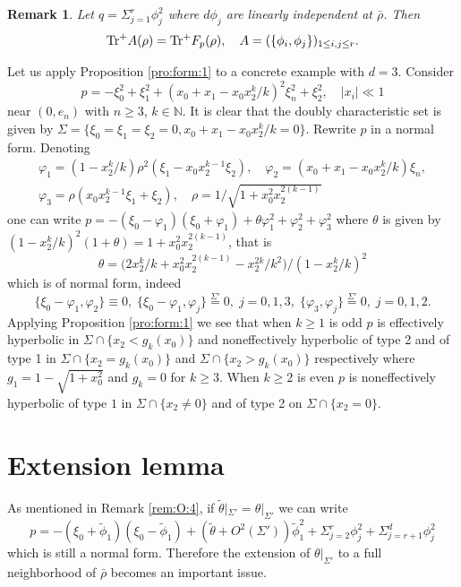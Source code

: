 \documentclass[12pt,leqno]{article} %
\def\sieq{\overset{\Sigma'}{=}}
\def\N{{\mathbb N}}
\def\bro{\bar\rho}
\def\N{\mathbb{N}}
\def\bro{\bar\rho}
\numberwithin{equation}{section}
\newtheorem{remark}{Remark}[section]
\begin{document}
%
\begin{remark}\rm
Let $q=\Sigma_{j=1}^r\phi_j^2$ where $d\phi_j$ are linearly independent at $\bro$. Then
%
\begin{equation}
\label{eq:sei:tr}
{\rm Tr^{+}}A(\rho)={\rm Tr^{+}}F_p(\rho),\quad A=(\{\phi_i,\phi_j\})_{1\leq i,j\leq r}.
\end{equation}
%
\end{remark}
%
%
Let us apply Proposition \ref{pro:form:1} to a concrete example with $d=3$.  Consider
%
\begin{equation}
\label{eq:rei:2}
p=-\xi_0^2+\xi_1^2+(x_0+x_1-x_0x_2^k/k)^2\xi_n^2+\xi_2^2,\quad |x_i|\ll 1
\end{equation}
%
near $(0,e_n)$ with $n\geq 3$, $k\in\N$. It is clear that the doubly characteristic set is given by $
\Sigma=\{\xi_0=\xi_1=\xi_2=0, x_0+x_1-x_0x_2^{k}/k=0\}$. Rewrite $p$ in a normal form. Denoting 
%
\begin{gather*}
\varphi_1=(1-x_2^k/k)\rho^2(\xi_1-x_0x_2^{k-1}\xi_2),\quad \varphi_2=(x_0+x_1-x_0x_2^{k}/k)\xi_n,\\
 \varphi_3=\rho (x_0x_2^{k-1}\xi_1+\xi_2),\quad \rho=1/\sqrt{1+x_0^2x_2^{2(k-1)}}
\end{gather*}
%
one can write $
p=-(\xi_0-\varphi_1)(\xi_0+\varphi_1)+\theta\varphi_1^2+\varphi_2^2+\varphi_3^2$ 
where $\theta$ is given by $(1-x_2^k/k)^2(1+\theta)=1+x_0^2x_2^{2(k-1)}$, that is
%
\[
\theta=\big(2x_2^k/k+x_0^2x_2^{2(k-1)}-x_2^{2k}/k^2\big)/(1-x_2^k/k)^2
\]
%
 which is of normal form, indeed 
%
\[
\{\xi_0-\varphi_1,\varphi_2\}\equiv 0,\;\{\xi_0-\varphi_1,\varphi_j\}\sieq 0,\; j=0,1,3,\;\{\varphi_3,\varphi_j\}\sieq 0,\; j=0,1,2.
\]
%
Applying Proposition \ref{pro:form:1} we see that when $k\geq 1$ is odd $p$ is effectively hyperbolic in $\Sigma\cap\{x_2<g_k(x_0)\}$ and noneffectively hyperbolic of type 2 and of type 1 in $\Sigma\cap\{x_2=g_k(x_0)\}$ and $\Sigma\cap\{x_2>g_k(x_0)\}$ respectively where $g_1=1-\sqrt{1+x_0^2}$ and $g_k=0$ for $k\geq 3$. When $k\geq 2$ is even $p$ is noneffectively hyperbolic of type $1$ in $\Sigma\cap\{x_2\neq 0\}$ and of type 2 on $\Sigma\cap\{x_2=0\}$. 









\section{Extension lemma}
\label{exlem}
%
As mentioned in Remark \ref{rem:O:4}, if $\tilde\theta|_{\Sigma'}=\theta|_{\Sigma'}$ we can write
%
\[
p=-(\xi_0+\tilde\phi_1)(\xi_0-\tilde\phi_1)+(\tilde\theta+O^2(\Sigma'))\tilde\phi_1^2+\Sigma_{j=2}^r\phi_j^2+\Sigma_{j=r+1}^d\phi_j^2
\]
%
which is still a normal form. Therefore the extension of $\theta|_{\Sigma'}$ to a full neighborhood of $\bro$ becomes an important issue.
\end{document}
